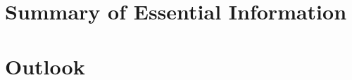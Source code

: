 



\section{Summary of Essential Information}
\label{sec:conclusion}

\section{Outlook}
\label{sec:futureWork}





